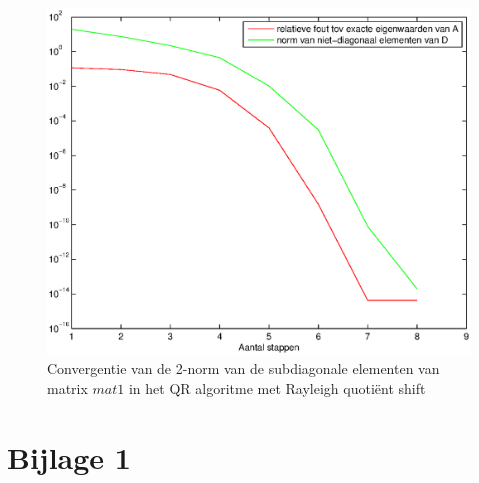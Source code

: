 \documentclass[a4paper]{article}
\begin{document}
\begin{figure}[H]
\centerline{\includegraphics{pictures/opgave10.eps}}
\caption{Convergentie van de 2-norm van de subdiagonale elementen van matrix $mat1$ in het QR algoritme met Rayleigh quoti\"{e}nt shift}
\label{fig:figure 3}
\end{figure}
\newpage
\section*{Bijlage 1} 

\label{bijlage1}
\end{document}
